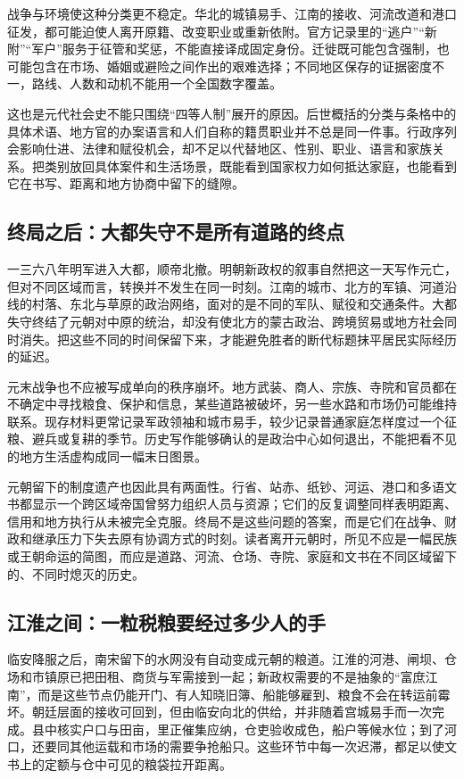 战争与环境使这种分类更不稳定。华北的城镇易手、江南的接收、河流改道和港口征发，都可能迫使人离开原籍、改变职业或重新依附。官方记录里的“逃户”“新附”“军户”服务于征管和奖惩，不能直接译成固定身份。迁徙既可能包含强制，也可能包含在市场、婚姻或避险之间作出的艰难选择；不同地区保存的证据密度不一，路线、人数和动机不能用一个全国数字覆盖。

这也是元代社会史不能只围绕“四等人制”展开的原因。后世概括的分类与条格中的具体术语、地方官的办案语言和人们自称的籍贯职业并不总是同一件事。行政序列会影响仕进、法律和赋役机会，却不足以代替地区、性别、职业、语言和家族关系。把类别放回具体案件和生活场景，既能看到国家权力如何抵达家庭，也能看到它在书写、距离和地方协商中留下的缝隙。

\subsection{终局之后：大都失守不是所有道路的终点}

一三六八年明军进入大都，顺帝北撤。明朝新政权的叙事自然把这一天写作元亡，但对不同区域而言，转换并不发生在同一时刻。江南的城市、北方的军镇、河道沿线的村落、东北与草原的政治网络，面对的是不同的军队、赋役和交通条件。大都失守终结了元朝对中原的统治，却没有使北方的蒙古政治、跨境贸易或地方社会同时消失。把这些不同的时间保留下来，才能避免胜者的断代标题抹平居民实际经历的延迟。

元末战争也不应被写成单向的秩序崩坏。地方武装、商人、宗族、寺院和官员都在不确定中寻找粮食、保护和信息，某些道路被破坏，另一些水路和市场仍可能维持联系。现存材料更常记录军政领袖和城市易手，较少记录普通家庭怎样度过一个征粮、避兵或复耕的季节。历史写作能够确认的是政治中心如何退出，不能把看不见的地方生活虚构成同一幅末日图景。

元朝留下的制度遗产也因此具有两面性。行省、站赤、纸钞、河运、港口和多语文书都显示一个跨区域帝国曾努力组织人员与资源；它们的反复调整同样表明距离、信用和地方执行从未被完全克服。终局不是这些问题的答案，而是它们在战争、财政和继承压力下失去原有协调方式的时刻。读者离开元朝时，所见不应是一幅民族或王朝命运的简图，而应是道路、河流、仓场、寺院、家庭和文书在不同区域留下的、不同时熄灭的历史。

\subsection{江淮之间：一粒税粮要经过多少人的手}

临安降服之后，南宋留下的水网没有自动变成元朝的粮道。江淮的河港、闸坝、仓场和市镇原已把田租、商货与军需接到一起；新政权需要的不是抽象的“富庶江南”，而是这些节点仍能开门、有人知晓旧簿、船能够雇到、粮食不会在转运前霉坏。朝廷层面的接收可回到，但由临安向北的供给，并非随着宫城易手而一次完成。县中核实户口与田亩，里正催集应纳，仓吏验收成色，船户等候水位；到了河口，还要同其他运载和市场的需要争抢船只。这些环节中每一次迟滞，都足以使文书上的定额与仓中可见的粮袋拉开距离。

